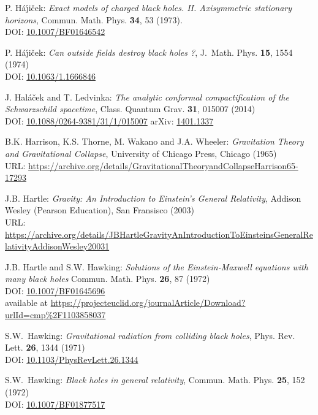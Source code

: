 \begin{thebibliography}{123}
P. H\'a\'\j i\v{c}ek: {\em Exact models of charged black holes.
II. Axisymmetric stationary horizons},
Commun. Math. Phys. {\bf 34}, 53 (1973). \\
DOI: \href{https://doi.org/10.1007/BF01646542}{10.1007/BF01646542}

P. H\'a\'\j i\v{c}ek: {\em Can outside fields destroy black holes ?},
J.~Math. Phys. {\bf 15}, 1554 (1974)\\
DOI: \href{https://doi.org/10.1063/1.1666846}{10.1063/1.1666846}

J. Hal\'a\v{c}ek and T. Ledvinka:
{\em The analytic conformal compactification of the Schwarzschild spacetime},
Class. Quantum Grav. {\bf 31}, 015007 (2014)\\
DOI: \href{https://doi.org/10.1088/0264-9381/31/1/015007}{10.1088/0264-9381/31/1/015007}\hfill
arXiv: \href{https://arxiv.org/abs/1401.1337}{1401.1337}

B.K. Harrison, K.S. Thorne, M. Wakano and J.A. Wheeler:
{\em Gravitation Theory and Gravitational Collapse},
University of Chicago Press, Chicago (1965)\\
URL: {\footnotesize\url{https://archive.org/details/GravitationalTheoryandCollapseHarrison65-17293}}

J.B. Hartle: \emph{Gravity: An Introduction to Einstein's General Relativity},
Addison Wesley (Pearson Education), San Fransisco (2003)\\
URL: {\footnotesize\url{https://archive.org/details/JBHartleGravityAnIntroductionToEinsteinsGeneralRelativityAddisonWesley20031}}

J.B. Hartle and S.W. Hawking:
{\em Solutions of the Einstein-Maxwell equations with many black holes}
Commun. Math. Phys. {\bf 26}, 87 (1972)\\
DOI: \href{https://doi.org/10.1007/BF01645696}{10.1007/BF01645696}\\
available at {\footnotesize\url{https://projecteuclid.org/journalArticle/Download?urlId=cmp%2F1103858037}}

S.W.~Hawking: {\em Gravitational radiation from colliding black holes},
Phys. Rev. Lett. {\bf 26}, 1344 (1971)\\
DOI: \href{https://doi.org/10.1103/PhysRevLett.26.1344}{10.1103/PhysRevLett.26.1344}

S.W.~Hawking: {\em Black holes in general relativity},
Commun. Math. Phys. {\bf 25}, 152 (1972)\\
DOI: \href{https://doi.org/10.1007/BF01877517}{10.1007/BF01877517}


\end{thebibliography}
